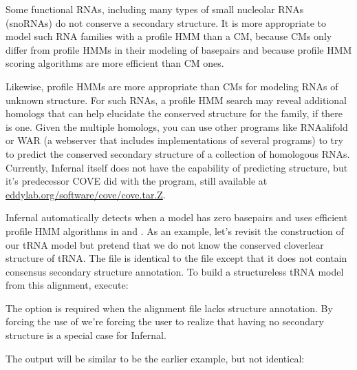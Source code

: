 Some functional RNAs, including many types of small nucleolar RNAs
(snoRNAs) do not conserve a secondary structure. It is more
appropriate to model such RNA families with a profile HMM than a CM,
because CMs only differ from profile HMMs in their modeling of
basepairs and because profile HMM scoring algorithms are more
efficient than CM ones.

Likewise, profile HMMs are more appropriate than CMs for modeling RNAs
of unknown structure. For such RNAs, a profile HMM search may reveal
additional homologs that can help elucidate the conserved structure
for the family, if there is one. Given the multiple homologs, you can
use other programs like RNAalifold \citep{Bernhart08,Hofacker02} or
WAR \citep{Torarinsson08b} (a webserver that includes implementations
of several programs) to try to predict the conserved secondary
structure of a collection of homologous RNAs. Currently, Infernal
itself does not have the capability of predicting structure, but it's
predecessor COVE did with the  program, still available at
\url{eddylab.org/software/cove/cove.tar.Z}.

Infernal automatically detects when a model has zero basepairs and
uses efficient profile HMM algorithms in  and
. As an example, let's revisit the construction of our
tRNA model but pretend that we do not know the conserved cloverlear
structure of tRNA. The file 
 is identical to the file 
 except that it does not contain consensus
secondary structure annotation. 
To build a structureless tRNA model from this alignment, execute:


The  option is required when the alignment file lacks
structure annotation. By forcing the use of  we're
forcing the user to realize that having no secondary structure is a
special case for Infernal.

The output will be similar to be the earlier example, but not
identical:

